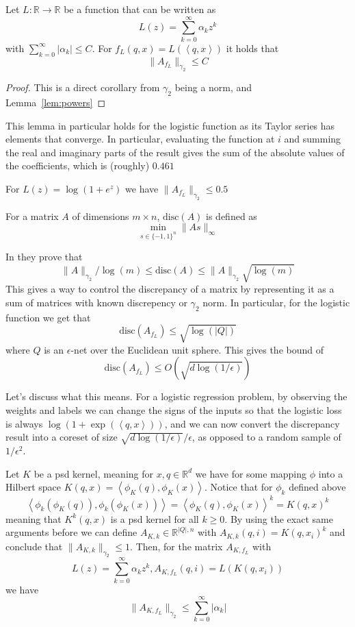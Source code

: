 \documentclass[anon,12pt]{colt2019} %
\newcommand{\ip}[1]{\left \langle #1 \right \rangle}
\newcommand{\R}{\mathbb{R}}
\newcommand{\eps}{\epsilon}
\newcommand{\disc}{\text{disc}}
\begin{document}
\begin{lemma}
Let $L:\R \to \R$ be a function that can be written as 
$$ L(z) = \sum_{k=0}^\infty \alpha_k z^k$$
with $\sum_{k=0}^{\infty} |\alpha_k| \leq C$. For $f_L(q,x) = L(\ip{q,x})$ it holds that 
$$ \|A_{f_L}\|_{\gamma_2} \leq C $$
\end{lemma}
\begin{proof}
This is a direct corollary from $\gamma_2$ being a norm, and Lemma~\ref{lem:powers}
\end{proof}

This lemma in particular holds for the logistic function as its Taylor series has elements that converge. In particular, evaluating the function at $i$ and summing the real and imaginary parts of the result gives the sum of the absolute values of the coefficients, which is (roughly) $0.461$
\begin{corollary}
For $L(z) = \log(1+e^z)$ we have $\|A_{f_L}\|_{\gamma_2} \leq 0.5$
\end{corollary}

\begin{definition}
For a matrix $A$ of dimensions $m \times n$, $\disc(A)$ is defined as 
$$ \min_{s \in \{-1,1\}^n} \|As\|_\infty $$
\end{definition}
In \cite{matouvsek2014factorization} they prove that 
$$\|A\|_{\gamma_2} / \log(m) \leq \disc(A) \leq \|A\|_{\gamma_2}  \sqrt{\log(m)}$$
This gives a way to control the discrepancy of a matrix by representing it as a sum of matrices with known discrepency or $\gamma_2$ norm. In particular, for the logistic function we get that 
$$\disc(A_{f_L}) \leq \sqrt{\log(|Q|)} $$
where $Q$ is an $\eps$-net over the Euclidean unit sphere. This gives the bound of 
$$\disc(A_{f_L}) \leq O(\sqrt{d\log(1/\eps)}) $$

Let's discuss what this means. For a logistic regression problem, by observing the weights and labels we can change the signs of the inputs so that the logistic loss is always $\log(1+\exp(\ip{q,x}))$, and we can now convert the discrepancy result into a coreset of size $\sqrt{d\log(1/\eps)}/\eps$, as opposed to a random sample of $1/\eps^2$. 

Let $K$ be a psd kernel, meaning for $x,q \in \R^d$ we have for some mapping $\phi$ into a Hilbert space $K(q,x) = \ip{\phi_K(q), \phi_K(x)}$. Notice that for $\phi_k$ defined above
$$ \ip{\phi_k(\phi_K(q)), \phi_k(\phi_K(x))} = \ip{\phi_K(q), \phi_K(x)}^k = K(q,x)^k $$
meaning that $K^k(q,x)$ is a psd kernel for all $k \geq 0$. By using the exact same arguments before we can define $A_{K,k} \in \R^{|Q|,n}$ with $A_{K,k}(q,i) = K(q, x_i)^k$ and conclude that $\|A_{K,k}\|_{\gamma_2} \leq 1$. Then, for the matrix $A_{K,f_L}$ with
$$ L(z) = \sum_{k=0}^\infty \alpha_k z^k, A_{K,f_L}(q,i) = L(K(q,x_i))$$
we have 
$$\|A_{K,f_L}\|_{\gamma_2} \leq \sum_{k=0}^{\infty} |\alpha_k| $$
\end{document}
